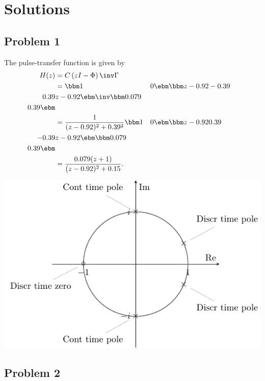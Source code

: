 \documentclass{scrartcl}
\begin{document}
\section*{Solutions}
\label{sec-6}
\subsection*{Problem 1}
\label{sec-6-1}

The pulse-transfer function is given by
\begin{equation*}
\begin{split}
H(z) &= C\left(zI - \Phi\right)\inv \Gamma\\
     &= \bbm 1 & 0 \ebm \bbm z-0.92 & -0.39\\0.39 & z-0.92 \ebm\inv \bbm 0.079\\0.39 \ebm\\
     &= \frac{1}{(z-0.92)^2 + 0.39^2}\bbm 1 & 0 \ebm \bbm z-0.92 & 0.39\\-0.39 & z-0.92 \ebm \bbm 0.079\\0.39\ebm \\
     &= \frac{0.079(z+1)}{(z-0.92)^2 + 0.15}.
\end{split}
\end{equation*}
\begin{center}
\includegraphics[]{complex-plane-sol}
\end{center}
\subsection*{Problem 2}
\label{sec-6-2}
\end{document}
